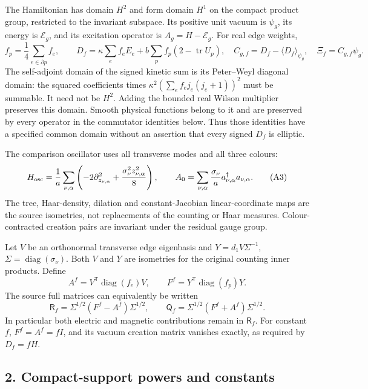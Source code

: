 \documentclass[
  11pt,
]{article}
\begin{document}
The Hamiltonian has domain \(H^2\) and form domain \(H^1\) on the
compact product group, restricted to the invariant subspace. Its
positive unit vacuum is \(\psi_g\), its energy is \(\mathcal E_g\), and
its excitation operator is \(A_g=H-\mathcal E_g\). For real edge
weights, \[
 f_p=\frac14\sum_{e\in\partial p}f_e,\qquad
 D_f=\kappa\sum_ef_eE_e+b\sum_pf_p(2-\operatorname{tr}U_p),
 \quad C_{g,f}=D_f-\langle D_f\rangle_{\psi_g},\quad
 \Xi_f=C_{g,f}\psi_g.
\tag{A2}
\] The self-adjoint domain of the signed kinetic sum is its Peter--Weyl
diagonal domain: the squared coefficients times
\(\kappa^2(\sum_e f_ej_e(j_e+1))^2\) must be summable. It need not be
\(H^2\). Adding the bounded real Wilson multiplier preserves this
domain. Smooth physical functions belong to it and are preserved by
every operator in the commutator identities below. Thus those identities
have a specified common domain without an assertion that every signed
\(D_f\) is elliptic.

The comparison oscillator uses all transverse modes and all three
colours: \[
 H_{\rm osc}=\frac1a\sum_{\nu,\alpha}
 \left(-2\partial_{z_{\nu,\alpha}}^2+
       \frac{\sigma_\nu^2z_{\nu,\alpha}^2}{8}\right),\qquad
 A_0=\sum_{\nu,\alpha}\frac{\sigma_\nu}{a}
                         a_{\nu,\alpha}^\dagger a_{\nu,\alpha}.
\tag{A3}
\] The tree, Haar-density, dilation and constant-Jacobian
linear-coordinate maps are the source isometries, not replacements of
the counting or Haar measures. Colour-contracted creation pairs are
invariant under the residual gauge group.

Let \(V\) be an orthonormal transverse edge eigenbasis and
\(Y=d_1V\Sigma^{-1}\), \(\Sigma=\operatorname{diag}(\sigma_\nu)\). Both
\(V\) and \(Y\) are isometries for the original counting inner products.
Define \[
 A^f=V^{\mathsf T}\operatorname{diag}(f_e)V,\qquad
 F^f=Y^{\mathsf T}\operatorname{diag}(f_p)Y.
\] The source full matrices can equivalently be written \[
 \mathsf R_f=\Sigma^{1/2}(F^f-A^f)\Sigma^{1/2},\qquad
 \mathsf Q_f=\Sigma^{1/2}(F^f+A^f)\Sigma^{1/2}.
\tag{A4}
\] In particular both electric and magnetic contributions remain in
\(\mathsf R_f\). For constant \(f\), \(F^f=A^f=fI\), and its vacuum
creation matrix vanishes exactly, as required by \(D_f=fH\).

\subsection{2. Compact-support powers and
constants}\label{weak-coupling-part-10-compact-support-powers-and-constants}
\end{document}
